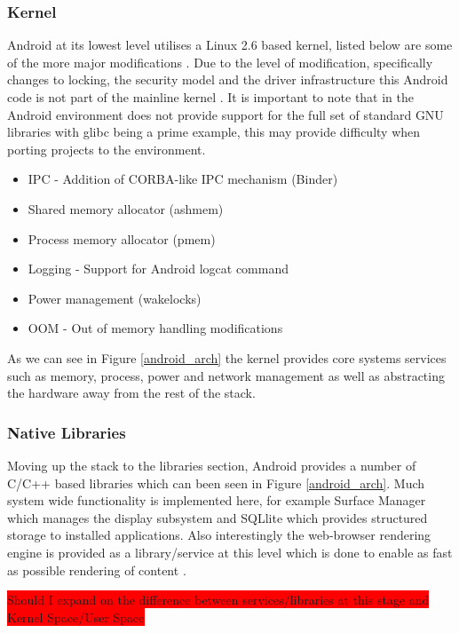 \subsubsection{Kernel}
Android at its lowest level utilises a Linux 2.6 based kernel, listed below are some of the more major modifications \cite{elinuxandroidkernel}. Due to the level of modification, specifically changes to locking, the security model and the driver infrastructure this Android code is not part of the mainline kernel \cite{registerAndroidKernel10}. It is important to note that in the Android environment does not provide support for the full set of standard GNU libraries with glibc being a prime example, this may provide difficulty when porting projects to the environment.

\begin{itemize}
\item IPC - Addition of CORBA-like IPC mechanism (Binder)
\item Shared memory allocator (ashmem)
\item Process memory allocator (pmem)
\item Logging - Support for Android logcat command
\item Power management (wakelocks) 
\item OOM - Out of memory handling modifications
\end{itemize}

As we can see in Figure \ref{android_arch} the kernel provides core systems services such as memory, process, power and network management as well as abstracting the hardware away from the rest of the stack.

\subsubsection{Native Libraries}
Moving up the stack to the libraries section, Android provides a number of C/C++ based libraries which can been seen in Figure \ref{android_arch}. Much system wide functionality is implemented here, for example Surface Manager which manages the display subsystem and SQLlite which provides structured storage to installed applications. Also interestingly the web-browser rendering engine is provided as a library/service at this level which is done to enable as fast as possible rendering of content \cite{googioanatomy08}. 

\colorbox{red}{Should I expand on the difference between services/libraries at this stage and Kernel Space/User Space}

